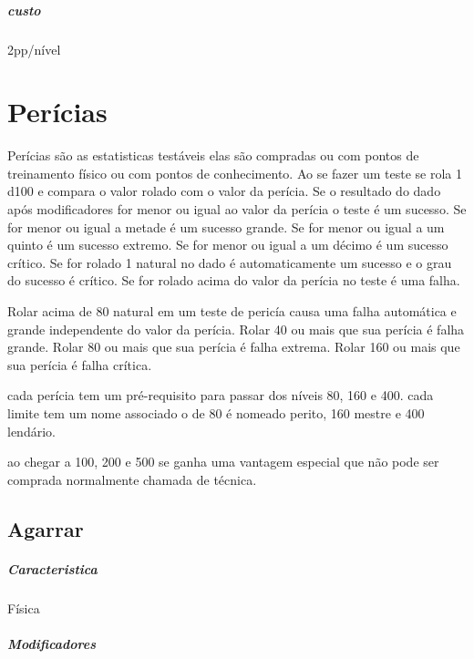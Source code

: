 \paragraph{custo} 2pp/nível
%
%
%
%
\chapter{Perícias}
Perícias são as estatisticas testáveis elas são compradas ou com pontos de treinamento físico ou com pontos de conhecimento.
Ao se fazer um teste se rola 1 d100 e compara o valor rolado com o valor da perícia.
Se o resultado do dado após modificadores for menor ou igual ao valor da perícia o teste é um sucesso.
Se for menor ou igual a metade é um sucesso grande.
Se for menor ou igual a um quinto é um sucesso extremo.
Se for menor ou igual a um décimo é um sucesso crítico.
Se for rolado 1 natural no dado é automaticamente um sucesso e o grau do sucesso é crítico.
Se for rolado acima do valor da perícia no teste é uma falha.

Rolar acima de 80 natural em um teste de pericía causa uma falha automática e grande independente do valor da perícia.
Rolar 40 ou mais que sua perícia é falha grande.
Rolar 80 ou mais que sua perícia é falha extrema.
Rolar 160 ou mais que sua perícia é falha crítica.

cada perícia tem um pré-requisito para passar dos níveis 80, 160 e 400.
cada limite tem um nome associado o de 80 é nomeado perito, 160 mestre e 400 lendário.

ao chegar a 100, 200 e 500 se ganha uma vantagem especial que não pode ser comprada normalmente chamada de técnica.
\section{Agarrar}
\paragraph{Caracteristica} Física
\paragraph{Modificadores} %
